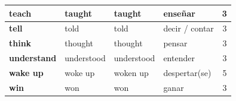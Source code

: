 \documentclass[11pt,a4paper]{article}
\begin{document}
\begin{longtable}{|>{\bfseries}p{2.6cm}|p{3.4cm}|p{3.6cm}|>{\raggedright\arraybackslash}p{6.0cm}|c|}
\rowcolor{verdeC} teach & taught & taught & enseñar & 3\\ \hline
\rowcolor{verdeC} tell & told & told & decir / contar & 3\\ \hline
\rowcolor{verdeC} think & thought & thought & pensar & 3\\ \hline
\rowcolor{verdeC} understand & understood & understood & entender & 3\\ \hline
\rowcolor{rojoC} wake up & woke up & woken up & despertar(se) & 5\\ \hline
\rowcolor{verdeC} win & won & won & ganar & 3\\ \hline
\end{longtable}
\end{document}
